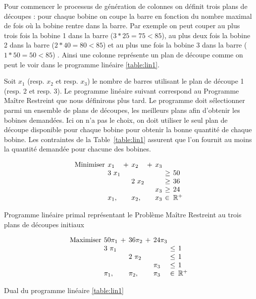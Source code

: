 Pour commencer le processus de génération de colonnes on définit trois plans de découpes : pour chaque bobine on coupe la barre en fonction du nombre maximal de fois où la bobine rentre dans la barre.
Par exemple on peut couper au plus trois fois la bobine 1 dans la barre ($3 * 25 = 75 < 85 $),  au plus deux fois la bobine 2 dans la barre ($2 * 40 = 80 < 85 $) et au plus une fois la bobine 3 dans la barre ($1 * 50 = 50 < 85 $) .
Ainsi une colonne représente un plan de découpe comme on peut le voir dans le programme linéaire \ref{table:lin1}.




Soit $x_1$ (resp. $x_2$ et resp. $x_3$) le nombre de barres utilisant le plan de découpe 1 (resp. 2 et resp. 3). Le programme linéaire suivant correspond au Programme Maître Restreint que nous définirons plus tard. 
Le programme doit sélectionner parmi un ensemble de plans de découpes, les meilleurs plans afin d'obtenir les bobines demandées.
Ici on n'a pas le choix, on doit utiliser le seul plan de découpe disponible pour chaque bobine pour obtenir la bonne quantité de chaque bobine.
Les contraintes de la Table~\ref{table:lin1} assurent que l'on fournit au moins la quantité demandée pour chacune des bobines.  
\begin{table}[H]

\centering
\begin{minipage}[t]{0.4\linewidth}
$$
\arraycolsep=2pt
\begin{array}{*8l}
\text{Minimiser} & x_1 & + & x_2 & + & x_3 & &\\
& 3~x_1 & & & & & \geq & 50\\
& & & 2~x_2 & & & \geq & 36 \\
& & & & & x_3 & \geq & 24 \\
&x_1, & & x_2,& & x_3 & \in & \mathbb{R}^{+}
\end{array}
$$
\caption{Programme linéaire primal représentant le Problème Maître Restreint au trois plans de découpes initiaux\label{table:lin1}}
\end{minipage}
\hspace{1cm}
\begin{minipage}[t]{0.35\linewidth}
$$
\arraycolsep=2pt
\begin{array}{*8l}
\text{Maximiser} & 50\pi_1 & + & 36\pi_2 & + & 24\pi_3 & &\\
& 3~\pi_1 & &  & & & \leq & 1\\
&  & &2~\pi_2  & &  & \leq & 1\\
& & &  & & \pi_3 & \leq & 1\\
& \pi_1, & & \pi_2, &  & \pi_3 & \in & \mathbb{R}^{+}
\end{array}
$$
\caption{Dual du programme linéaire \ref{table:lin1}\label{table:dual}}
\end{minipage}
\hfill
\end{table}

